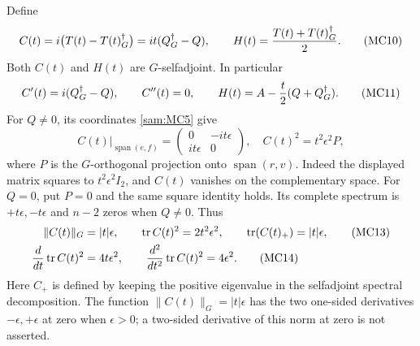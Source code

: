 Define
\begin{equation}
 C(t)=i\bigl(T(t)-T(t)^\dagger_G\bigr)
      =it(Q^\dagger_G-Q),\qquad
 H(t)=\frac{T(t)+T(t)^\dagger_G}{2}.
 \tag{MC10}\label{sam:MC10}
\end{equation}
Both \(C(t)\) and \(H(t)\) are \(G\)-selfadjoint. In particular
\begin{equation}
 C'(t)=i(Q^\dagger_G-Q),\qquad C''(t)=0,\qquad
 H(t)=A-\frac t2(Q+Q^\dagger_G).
 \tag{MC11}\label{sam:MC11}
\end{equation}
For \(Q\ne0\), its coordinates \eqref{sam:MC5} give
\begin{equation}
 C(t)|_{\operatorname{span}(e,f)}
 =\begin{pmatrix}0&-it\epsilon\\it\epsilon&0\end{pmatrix},
 \quad
 C(t)^2=t^2\epsilon^2 P,
 \tag{MC12}\label{sam:MC12}
\end{equation}
where \(P\) is the \(G\)-orthogonal projection onto
\(\operatorname{span}(r,v)\). Indeed the displayed matrix squares to
\(t^2\epsilon^2I_2\), and \(C(t)\) vanishes on the complementary space.
For \(Q=0\), put \(P=0\) and the same square identity holds.
Its complete spectrum is \(+t\epsilon,-t\epsilon\) and \(n-2\) zeros
when \(Q\ne0\). Thus
\begin{align}
 \|C(t)\|_G&=|t|\epsilon,\qquad
 \operatorname{tr} C(t)^2=2t^2\epsilon^2,\qquad
 \operatorname{tr}(C(t)_+)=|t|\epsilon, \tag{MC13}\label{sam:MC13}\\
 \frac{d}{dt}\operatorname{tr} C(t)^2&=4t\epsilon^2,\qquad
 \frac{d^2}{dt^2}\operatorname{tr} C(t)^2=4\epsilon^2.
 \tag{MC14}\label{sam:MC14}
\end{align}
Here \(C_+\) is defined by keeping the positive eigenvalue in the
selfadjoint spectral decomposition. The function
\(\|C(t)\|_G=|t|\epsilon\) has the two one-sided derivatives
\(-\epsilon,+\epsilon\) at zero when \(\epsilon>0\); a two-sided
derivative of this norm at zero is not asserted.

